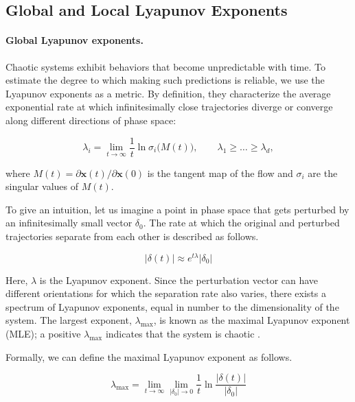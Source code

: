 \documentclass{article}
\begin{document}
\subsection{Global and Local Lyapunov Exponents}

\paragraph{Global Lyapunov exponents.}
Chaotic systems exhibit behaviors that become unpredictable with time. To estimate the degree to which making such predictions is reliable, we use the Lyapunov exponents as a metric. By definition, they characterize the average exponential rate at which infinitesimally close trajectories diverge or converge along different directions of phase space:

\begin{equation}
    \lambda_i = \lim_{t \to \infty} \frac{1}{t} \ln \sigma_i\bigl(M(t)\bigr),
  \qquad \lambda_1 \geq \dots \geq \lambda_d,
\end{equation}

where $M(t) = \partial \mathbf{x}(t) / \partial \mathbf{x}(0)$ is the tangent map of the flow and $\sigma_i$ are the singular values of $M(t)$.

To give an intuition, let us imagine a point in phase space that gets perturbed by an infinitesimally small vector $\delta_0$. The rate at which the original and perturbed trajectories separate from each other is described as follows.

\begin{equation}
    \vert \delta(t) \vert \approx e^{t \lambda} \vert \delta_0 \vert
\end{equation}

Here, $\lambda$ is the Lyapunov exponent. Since the perturbation vector can have different orientations for which the separation rate also varies, there exists a spectrum of Lyapunov exponents, equal in number to the dimensionality of the system. The largest exponent, $\lambda_{\max}$, is known as the maximal Lyapunov exponent (MLE); a positive $\lambda_{\max}$ indicates that the system is chaotic \cite{strogatz_nonlinear_1994}.

Formally, we can define the maximal Lyapunov exponent as follows.

\begin{equation}
    \lambda_{\max} = \lim_{t \rightarrow \infty} \lim_{\vert \delta_0 \vert \rightarrow 0} \frac{1}{t} \ln{\frac{\vert \delta(t) \vert}{\vert \delta_0 \vert}}
\end{equation}
\end{document}
